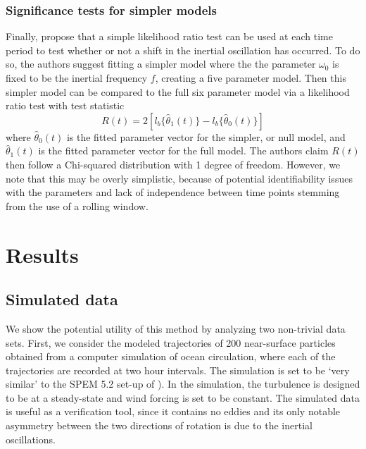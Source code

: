 \documentclass{stat572Style}
\begin{document}
\subsubsection{Significance tests for simpler models}
\label{sec: sig}
Finally, \citet{Sykulski2016} propose that a simple likelihood ratio test can be used at each time period to test whether or not a shift in the inertial oscillation has occurred. 
To do so, the authors suggest fitting a simpler model where the the parameter $\omega_{0}$ is fixed to be the inertial frequency $f$, creating a five parameter model. 
Then this simpler model can be compared to the full six parameter model via a likelihood ratio test with test statistic
\begin{equation}
\label{eq: LRT}
R(t) = 2[l_{b} \{\hat{\theta}_{1}(t) \} - l_{b}\{\hat{\theta}_{0}(t) \} ]
\end{equation}
where $\hat{\theta}_{0}(t)$ is the fitted parameter vector for the simpler, or null model, and $\hat{\theta}_{1}(t)$ is the fitted parameter vector for the full model.
 The authors claim $R(t)$ then follow a Chi-squared distribution with 1 degree of freedom. 
 However, we note that this may be overly simplistic, because of potential identifiability issues with the parameters and lack of independence between time points stemming from the use of a rolling window. 
 

\section{Results}
\subsection{Simulated data}
\par We show the potential utility of this method by analyzing two non-trivial data sets.  
First, we consider the modeled trajectories of 200 near-surface particles obtained from a computer simulation of ocean circulation, where each of the trajectories are recorded at two hour intervals. 
The simulation is set to be `very similar' to the SPEM 5.2 set-up of \citet{Danioux2008}). 
In the  simulation, the turbulence is designed to be at a steady-state and wind forcing is set to be  constant. 
The simulated data is useful as a verification tool, since  it contains no eddies and its only  notable asymmetry between the two directions of rotation is due to the inertial oscillations. 
\end{document}
